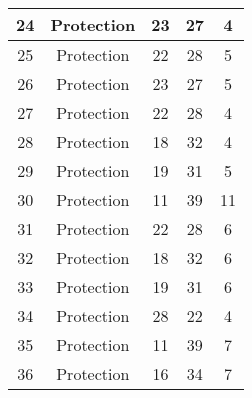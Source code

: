 \documentclass[results.tex]{subfiles}
\begin{document}
\begin{center}
\begin{tabular}{| c || c | c | c | c |}
            \hline
            24                      & Protection                   & 23                     & 27                      & 4                    \\
            \hline
            25                      & Protection                   & 22                     & 28                      & 5                    \\
            \hline
            26                      & Protection                   & 23                     & 27                      & 5                    \\
            \hline
            27                      & Protection                   & 22                     & 28                      & 4                    \\
            \hline
            28                      & Protection                   & 18                     & 32                      & 4                    \\
            \hline
            29                      & Protection                   & 19                     & 31                      & 5                    \\
            \hline
            30                      & Protection                   & 11                     & 39                      & 11                   \\
            \hline
            31                      & Protection                   & 22                     & 28                      & 6                    \\
            \hline
            32                      & Protection                   & 18                     & 32                      & 6                    \\
            \hline
            33                      & Protection                   & 19                     & 31                      & 6                    \\
            \hline
            34                      & Protection                   & 28                     & 22                      & 4                    \\
            \hline
            35                      & Protection                   & 11                     & 39                      & 7                    \\
            \hline
            36                      & Protection                   & 16                     & 34                      & 7                    \\

\end{tabular}
\end{center}
\end{document}
